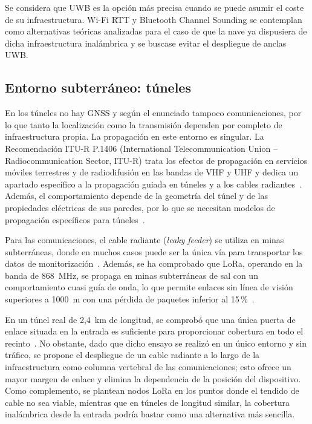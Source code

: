 \documentclass[11pt,a4paper]{article}
\begin{document}
Se considera que UWB es la opción más precisa cuando se puede asumir el coste de su infraestructura. Wi-Fi RTT y Bluetooth Channel Sounding se contemplan como alternativas teóricas analizadas para el caso de que la nave ya dispusiera de dicha infraestructura inalámbrica y se buscase evitar el despliegue de anclas UWB.

\subsection{Entorno subterráneo: túneles}
\label{sec:apartado3_5}

En los túneles no hay GNSS y según el enunciado tampoco comunicaciones, por lo que tanto la localización como la transmisión dependen por completo de infraestructura propia. La propagación en este entorno es singular. La Recomendación ITU-R P.1406 (International Telecommunication Union -- Radiocommunication Sector, ITU-R) trata los efectos de propagación en servicios móviles terrestres y de radiodifusión en las bandas de VHF y UHF y dedica un apartado específico a la propagación guiada en túneles y a los cables radiantes~\cite{ref9}. Además, el comportamiento depende de la geometría del túnel y de las propiedades eléctricas de sus paredes, por lo que se necesitan modelos de propagación específicos para túneles~\cite{ref7}.

Para las comunicaciones, el cable radiante (\emph{leaky feeder}) se utiliza en minas subterráneas, donde en muchos casos puede ser la única vía para transportar los datos de monitorización~\cite{ref20}. Además, se ha comprobado que LoRa, operando en la banda de 868~MHz, se propaga en minas subterráneas de sal con un comportamiento cuasi guía de onda, lo que permite enlaces sin línea de visión superiores a 1000~m con una pérdida de paquetes inferior al 15\,\%~\cite{ref21}.

En un túnel real de 2,4~km de longitud, se comprobó que una única puerta de enlace situada en la entrada es suficiente para proporcionar cobertura en todo el recinto~\cite{ref22}. No obstante, dado que dicho ensayo se realizó en un único entorno y sin tráfico, se propone el despliegue de un cable radiante a lo largo de la infraestructura como columna vertebral de las comunicaciones; esto ofrece un mayor margen de enlace y elimina la dependencia de la posición del dispositivo. Como complemento, se plantean nodos LoRa en los puntos donde el tendido de cable no sea viable, mientras que en túneles de longitud similar, la cobertura inalámbrica desde la entrada podría bastar como una alternativa más sencilla.
\end{document}
